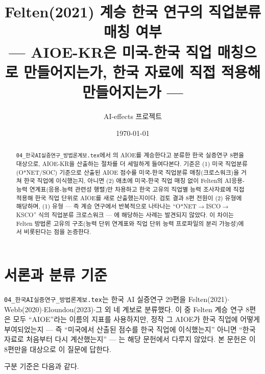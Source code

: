 \documentclass[11pt]{article}
\title{Felten(2021) 계승 한국 연구의 직업분류 매칭 여부\\[1mm]
\large --- AIOE-KR은 미국-한국 직업 매칭으로 만들어지는가, 한국 자료에 직접 적용해 만들어지는가 ---}
\author{AI-effects 프로젝트}
\date{\today}
\begin{document}
\maketitle

\begin{abstract}
\noindent \texttt{04\_한국AI실증연구\_방법론계보.tex}에서 \citet{felten-2021-occupational-industry-and-geographic-exposure}의 AIOE를 계승한다고 분류한 한국 실증연구 8편을 대상으로, AIOE-KR을 산출하는 절차를 더 세밀하게 들여다본다. 기준은 (1) 미국 직업분류(O*NET/SOC) 기준으로 산출된 AIOE 점수를 미국-한국 직업분류 매칭(크로스워크)을 거쳐 한국 직업에 이식했는지, 아니면 (2) 애초에 미국-한국 직업 매칭 없이 Felten의 AI응용-능력 연계표(응용-능력 관련성 행렬)만 차용하고 한국 고유의 직업별 능력 조사자료에 직접 적용해 한국 직업 단위로 AIOE를 새로 산출했는지이다. 검토 결과 8편 전원이 (2) 유형에 해당하며, (1) 유형 --- 즉 \citet{webb-2020-impact-artificial-intelligence-labor} 계승 연구에서 반복적으로 나타나는 ``O*NET$\to$ISCO$\to$KSCO'' 식의 직업분류 크로스워크 --- 에 해당하는 사례는 발견되지 않았다. 이 차이는 Felten 방법론 고유의 구조(능력 단위 연계표와 직업 단위 능력 프로파일의 분리 가능성)에서 비롯된다는 점을 논증한다.
\end{abstract}

\tableofcontents

\section{서론과 분류 기준}

\texttt{04\_한국AI실증연구\_방법론계보.tex}는 한국 AI 실증연구 29편을 Felten(2021)$\cdot$Webb(2020)$\cdot$Eloundou(2023)$\cdot$그 외 네 계보로 분류했다. 이 중 Felten 계승 연구 8편은 모두 ``AIOE''라는 이름의 지표를 사용하지만, 정작 그 AIOE가 한국 직업에 어떻게 부여되었는지 --- 즉 ``미국에서 산출된 점수를 한국 직업에 이식했는지'' 아니면 ``한국 자료로 처음부터 다시 계산했는지'' --- 는 해당 문헌에서 다루지 않았다. 본 문헌은 이 8편만을 대상으로 이 질문에 답한다.

구분 기준은 다음과 같다.
\end{document}
